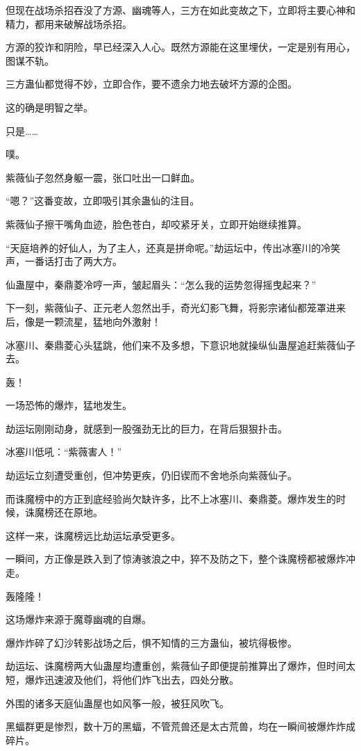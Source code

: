 \begin{this_body}
但现在战场杀招吞没了方源、幽魂等人，三方在如此变故之下，立即将主要心神和精力，都用来破解战场杀招。

方源的狡诈和阴险，早已经深入人心。既然方源能在这里埋伏，一定是别有用心，图谋不轨。

三方蛊仙都觉得不妙，立即合作，要不遗余力地去破坏方源的企图。

这的确是明智之举。

只是……

噗。

紫薇仙子忽然身躯一震，张口吐出一口鲜血。

“嗯？”这番变故，立即吸引其余蛊仙的注目。

紫薇仙子擦干嘴角血迹，脸色苍白，却咬紧牙关，立即开始继续推算。

“天庭培养的好仙人，为了主人，还真是拼命呢。”劫运坛中，传出冰塞川的冷笑声，一番话打击了两大方。

仙蛊屋中，秦鼎菱冷哼一声，皱起眉头：“怎么我的运势忽得摇曳起来？”

下一刻，紫薇仙子、正元老人忽然出手，奇光幻影飞舞，将影宗诸仙都笼罩进来后，像是一颗流星，猛地向外激射！

冰塞川、秦鼎菱心头猛跳，他们来不及多想，下意识地就操纵仙蛊屋追赶紫薇仙子去。

轰！

一场恐怖的爆炸，猛地发生。

劫运坛刚刚动身，就感到一股强劲无比的巨力，在背后狠狠扑击。

冰塞川低吼：“紫薇害人！”

劫运坛立刻遭受重创，但冲势更疾，仍旧锲而不舍地杀向紫薇仙子。

而诛魔榜中的方正到底经验尚欠缺许多，比不上冰塞川、秦鼎菱。爆炸发生的时候，诛魔榜还在原地。

这样一来，诛魔榜远比劫运坛承受更多。

一瞬间，方正像是跌入到了惊涛骇浪之中，猝不及防之下，整个诛魔榜都被爆炸冲走。

轰隆隆！

这场爆炸来源于魔尊幽魂的自爆。

爆炸炸碎了幻沙转影战场之后，惧不知情的三方蛊仙，被坑得极惨。

劫运坛、诛魔榜两大仙蛊屋均遭重创，紫薇仙子即便提前推算出了爆炸，但时间太短，爆炸迅速波及他们，将他们炸飞出去，四处分散。

外围的诸多天庭仙蛊屋也如风筝一般，被狂风吹飞。

黑蝠群更是惨烈，数十万的黑蝠，不管荒兽还是太古荒兽，均在一瞬间被爆炸炸成碎片。


\end{this_body}
